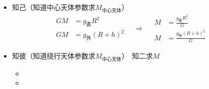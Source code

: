 \begin{itemize}
\item 知己（知道中心天体参数求$M_{\text{中心天体}}$）
\[
\begin{aligned}GM&=g_{\text{表}}R^{2}\\ GM&=g_{\text{外}}(R+h)^{2}\end{aligned}
\quad\Rightarrow\quad
\begin{aligned}M&=\frac{g_{\text{表}}R^{2}}{G}\\ M&=\frac{g_{\text{外}}(R+h)^{2}}{G}\end{aligned}
\]
\item 知彼（知道绕行天体参数求$M_{\text{中心天体}}$）\quad [$v$、$\omega/T$、$r$、$a$]\ 知二求$M$
  \begin{itemize}
  \item {}
  \item {}%
  \end{itemize}
\end{itemize}
